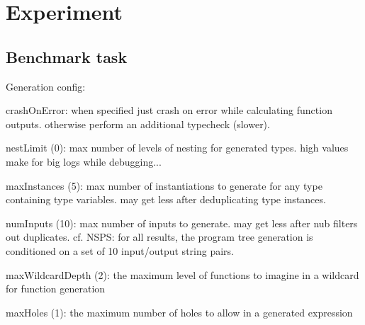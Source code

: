 \documentclass{article}
\begin{document}




\section{Experiment} \label{sec:experiment}

\subsection{Benchmark task}


Generation config:

crashOnError: when specified just crash on error while calculating function outputs. otherwise perform an additional typecheck (slower).

nestLimit (0): max number of levels of nesting for generated types. high values make for big logs while debugging...

maxInstances (5): max number of instantiations to generate for any type containing type variables. may get less after deduplicating type instances.

numInputs (10): max number of inputs to generate. may get less after nub filters out duplicates.
cf. NSPS: for all results, the program tree generation is conditioned on a set of 10 input/output string pairs.

maxWildcardDepth (2): the maximum level of functions to imagine in a wildcard for function generation

maxHoles (1): the maximum number of holes to allow in a generated expression
\end{document}
